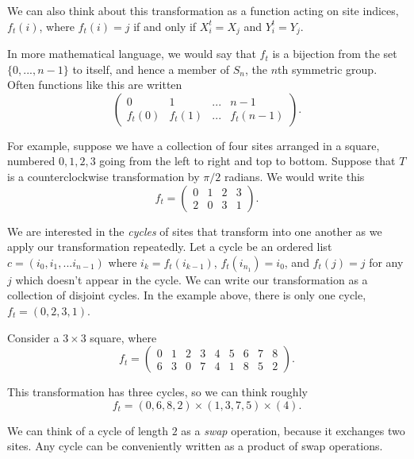 \documentclass{article}
\theoremstyle{definition}
\begin{document}
We can also think about this transformation as a function acting on site indices, $f_t(i)$, where $f_t(i)=j$ if and only if $X^t_i = X_j$ and $Y^t_i = Y_j$.

 In more mathematical language, we would say that $f_t$ is a bijection from the set $\{0,...,n-1\}$ to itself, and hence a member of $S_n$, the $n$th symmetric group. Often functions like this are written
\begin{equation}
\begin{pmatrix}
0 & 1 & ... & n-1 \\
f_t(0) & f_t(1) & ... & f_t(n-1)
\end{pmatrix}
.\end{equation}

For example, suppose we have a collection of four sites arranged in a square, numbered $0,1,2,3$ going from the left to right and top to bottom. Suppose that $T$ is a counterclockwise transformation by $\pi/2$ radians. We would write this
\begin{equation*}
f_t = 
\begin{pmatrix}
0 & 1 & 2 & 3 \\
2 & 0 & 3 & 1
\end{pmatrix}.
\end{equation*}

We are interested in the \emph{cycles} of sites that transform into one another as we apply our transformation repeatedly. Let a cycle be an ordered list $c = (i_0,i_1,...i_{n-1})$ where $i_k = f_t(i_{k-1})$, $f_t(i_{n_1}) = i_0$, and $f_t(j) = j$ for any $j$ which doesn't appear in the cycle. We can write our transformation as a collection of disjoint cycles. In the example above, there is only one cycle, $f_t = (0,2,3,1)$. 

Consider a $3 \times 3$ square, where
\begin{equation*}
f_t = 
\begin{pmatrix}
0 & 1 & 2 & 3 & 4 & 5 & 6 & 7 & 8 \\
6 & 3 & 0 & 7 & 4 & 1 & 8 & 5 & 2
\end{pmatrix}.
\end{equation*}

This transformation has three cycles, so we can think roughly
\begin{equation*}
f_t = (0,6,8,2) \times (1,3,7,5) \times (4).
\end{equation*}

We can think of a cycle of length $2$ as a \emph{swap} operation, because it exchanges two sites. Any cycle can be conveniently written as a product of swap operations.
\end{document}
